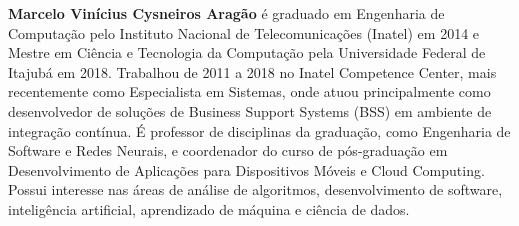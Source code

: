     \textbf{Marcelo Vinícius Cysneiros Aragão} é graduado em Engenharia de Computação pelo Instituto Nacional de Telecomunicações (Inatel) em 2014 e Mestre em Ciência e Tecnologia da Computação pela Universidade Federal de Itajubá em 2018. Trabalhou de 2011 a 2018 no Inatel Competence Center, mais recentemente como Especialista em Sistemas, onde atuou principalmente como desenvolvedor de soluções de Business Support Systems (BSS) em ambiente de integração contínua. É professor de disciplinas da graduação, como Engenharia de Software e Redes Neurais, e coordenador do curso de pós-graduação em Desenvolvimento de Aplicações para Dispositivos Móveis e Cloud Computing. Possui interesse nas áreas de análise de algoritmos, desenvolvimento de software, inteligência artificial, aprendizado de máquina e ciência de dados.